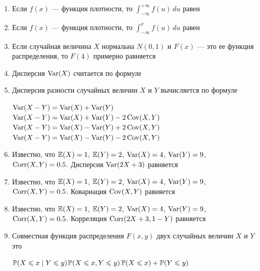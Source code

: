 \documentclass[12pt, a4paper]{article}\usepackage[]{graphicx}\usepackage[]{color}
\begin{document}
\begin{enumerate}
\item Если $f(x)$ — функция плотности, то $\int_{-\infty}^{+\infty}f(u)\,du$ равен


\item Если $f(x)$ — функция плотности, то $\int_{-\infty}^{x}f(u)\,du$ равен


\item Если случайная величина $X$ нормальна $N(0,1)$ и $F(x)$ — это ее функция распределения, то $F(4)$ примерно равняется


\newpage


\item Дисперсия $\Var(X)$ считается по формуле


\item Дисперсия разности случайных величин $X$ и $Y$ вычисляется по формуле

{$\Var(X-Y)=\Var(X)+\Var(Y)$}
{$\Var(X-Y)=\Var(X)+\Var(Y)-2\Cov(X,Y)$}
{$\Var(X-Y)=\Var(X)-\Var(Y)+2\Cov(X,Y)$}
{$\Var(X-Y)=\Var(X)-\Var(Y)-2\Cov(X,Y)$}

\item Известно, что $\E(X)=1$, $\E(Y)=2$, $\Var(X)=4$, $\Var(Y)=9$, $\Corr(X,Y)=0.5$. Дисперсия $\Var(2X+3)$  равняется



\item Известно, что $\E(X)=1$, $\E(Y)=2$, $\Var(X)=4$, $\Var(Y)=9$, $\Corr(X,Y)=0.5$. Ковариация $\Cov(X,Y)$  равняется



\item Известно, что $\E(X)=1$, $\E(Y)=2$, $\Var(X)=4$, $\Var(Y)=9$, $\Corr(X,Y)=0.5$. Корреляция $\Corr(2X+3,1-Y)$  равняется


\item Совместная функция распределения $F(x,y)$ двух случайных величин $X$ и $Y$ это

{$\P(X\leq x\mid Y\leq y)$}{$\P(X\leq x,Y\leq y)$}{$\P(X\leq x)+\P(Y\leq y)$}


\end{enumerate}
\end{document}
